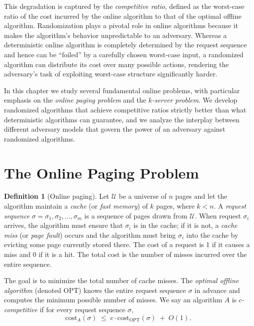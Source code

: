 \documentclass[twoside,12pt]{book}
\theoremstyle{plain}
\theoremstyle{definition}
\newtheorem{definition}[theorem]{Definition}
\theoremstyle{remark}
\begin{document}
This degradation is captured by the \emph{competitive ratio}, defined as
the worst-case ratio of the cost incurred by the online algorithm to that
of the optimal offline algorithm.  Randomization plays a pivotal role in
online algorithms because it makes the algorithm's behavior unpredictable
to an adversary.  Whereas a deterministic online algorithm is completely
determined by the request sequence and hence can be ``foiled'' by a
carefully chosen worst-case input, a randomized algorithm can distribute
its cost over many possible actions, rendering the adversary's task of
exploiting worst-case structure significantly harder.

In this chapter we study several fundamental online problems, with
particular emphasis on the \emph{online paging problem} and the
\emph{$k$-server problem}.  We develop randomized algorithms that achieve
competitive ratios strictly better than what deterministic algorithms can
guarantee, and we analyze the interplay between different adversary models
that govern the power of an adversary against randomized algorithms.

\section{The Online Paging Problem}
\label{sec:paging}

\begin{definition}[Online paging]
Let $\mathcal{U}$ be a universe of $n$ pages and let the algorithm
maintain a \emph{cache} (or \emph{fast memory}) of $k$ pages, where
$k < n$.  A \emph{request sequence} $\sigma = \sigma_1, \sigma_2,
\ldots, \sigma_m$ is a sequence of pages drawn from $\mathcal{U}$.  When
request $\sigma_i$ arrives, the algorithm must ensure that $\sigma_i$ is
in the cache; if it is not, a \emph{cache miss} (or \emph{page fault})
occurs and the algorithm must bring $\sigma_i$ into the cache by evicting
some page currently stored there.  The cost of a request is 1 if it
causes a miss and 0 if it is a hit.  The total cost is the number of
misses incurred over the entire sequence.
\end{definition}

The goal is to minimize the total number of cache misses.  The
\emph{optimal offline algorithm} (denoted OPT) knows the entire request
sequence $\sigma$ in advance and computes the minimum possible number of
misses.  We say an algorithm $A$ is \emph{$c$-competitive} if for every
request sequence $\sigma$,
\[
  \mathrm{cost}_A(\sigma) \;\le\; c \cdot \mathrm{cost}_{\mathrm{OPT}}(\sigma) \;+\; O(1).
\]
\end{document}
